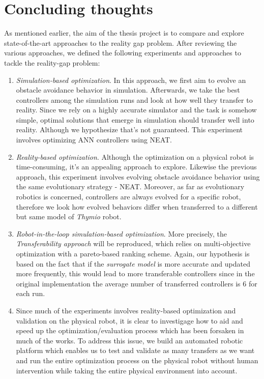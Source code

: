 \section{Concluding thoughts}

As mentioned earlier, the aim of the thesis project is to compare and explore state-of-the-art approaches to the reality gap problem. After reviewing the various approaches, we defined the following experiments and approaches to tackle the reality-gap problem:

\begin{enumerate}
    \item{\emph{Simulation-based optimization}. In this approach, we first aim to evolve an obstacle avoidance behavior in simulation. Afterwards, we take the best controllers among the simulation runs and look at how well they transfer to reality. Since we rely on a highly accurate simulator and the task is somehow simple, optimal solutions that emerge in simulation should transfer well into reality. Although we hypothesize that's not guaranteed. This experiment involves optimizing ANN controllers using NEAT.}
    
    \item{\emph{Reality-based optimization}. Although the optimization on a physical robot is time-consuming, it's an appealing approach to explore. Likewise the previous approach, this experiment involves evolving obstacle avoidance behavior using the same evolutionary strategy - NEAT. Moreover, as far as evolutionary robotics is concerned, controllers are always evolved for a specific robot, therefore we look how evolved behaviors differ when transferred to a different but same model of \emph{Thymio} robot.}
    
    \item{\emph{Robot-in-the-loop simulation-based optimization}. More precisely, the \emph{Transferability approach} will be reproduced, which relies on multi-objective optimization with a pareto-based ranking scheme. Again, our  hypothesis is based on the fact that if the \textit{surrogate model} is more accurate and updated more frequently, this would lead to more transferable controllers since in the original implementation the average number of transferred controllers is 6 for each run.}
    
    \item{Since much of the experiments involves reality-based optimization and validation on the physical robot, it is clear to investigage how to aid and speed up the optimization/evaluation process which has been forsaken in much of the works. To address this issue, we build an automated robotic platform which enables us to test and validate as many transfers as we want and run the entire optimization process on the physical robot without human intervention while taking the entire physical environment into account.}
\end{enumerate}




